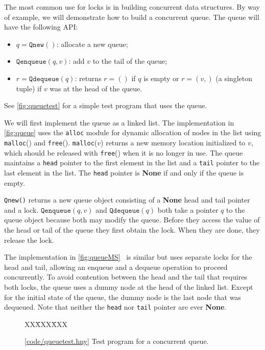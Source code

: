 \documentclass{report}
\newcommand{\harmonysource}[1]{
\begin{tabbing}
XX\=XXX\=XXX\kill
    
\end{tabbing}
}
\newcommand{\harmonylink}[1]{%
[\href{https://www.cs.cornell.edu/home/rvr/harmony/#1}{\underline{#1}}]%
}
\newenvironment{code}{
\tcolorbox
}{
\endtcolorbox
}
\begin{document}
The most common use for locks is in building concurrent data structures.
By way of example, we will demonstrate how to build a concurrent queue.
The queue will have the following API:
\begin{itemize}
\item $q = \mathtt{Qnew}()$: allocate a new queue;
\item $\mathtt{Qenqueue}(q, v)$: add $v$ to the tail of the queue;
\item $r = \mathtt{Qdequeue}(q)$: returns $r = ()$ if $q$ is empty or $r = (v,)$ (a singleton tuple)
if $v$ was at the head of the queue.
\end{itemize}
See \autoref{fig:queuetest} for a simple test program that uses the queue.

We will first implement the queue as a linked list.
The implementation in \autoref{fig:queue}
uses the \texttt{alloc} module for dynamic allocation
%
of nodes in the list using \texttt{malloc}() and \texttt{free}().
\texttt{malloc}($v$) returns a new memory location initialized to $v$,
which should be released with \texttt{free}() when it is no longer in use.
The queue maintains a \texttt{head} pointer to the first element in the list
and a \texttt{tail} pointer to the last element in the list.
The \texttt{head} pointer is \textbf{None} if and only if the queue is empty.

\texttt{Qnew()} returns a new queue object consisting of a \textbf{None} head
and tail pointer and a lock.
$\mathtt{Qenqueue}(q, v)$ and $\mathtt{Qdequeue}(q)$ both take a pointer $q$ to the
queue object because both may modify the queue.
Before they access the value of the head or tail of the queue they first obtain
the lock.
When they are done, they release the lock.

The implementation in \autoref{fig:queueMS}~\cite{MS98} is similar but uses
separate locks for the head and tail, allowing an enqueue and a dequeue operation
to proceed concurrently.  To avoid contention between the head and the tail that
requires both locks, the queue uses a dummy node at the head of the linked list.
Except for the initial state of the queue, the dummy node is the last node that
was dequeued.  Note that neither the \texttt{head} nor \texttt{tail} pointer are
ever \textbf{None}.

\begin{figure}
\begin{code}
\harmonysource{queuetest}
\end{code}
\caption{\harmonylink{code/queuetest.hny} Test program for a concurrent queue.}
\label{fig:queuetest}
\end{figure}
\end{document}
